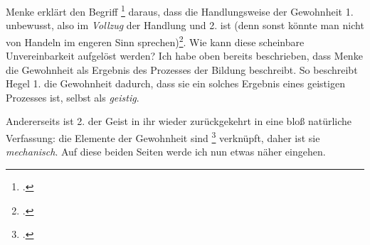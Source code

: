 \documentclass[12pt, a4paper, openany]{report}
\begin{document}
Menke erklärt den Begriff \footcite[][145]{menke_autonomie_2018} daraus, dass die Handlungsweise der Gewohnheit 1. unbewusst, also im \emph{Vollzug} der Handlung  und 2.  ist (denn sonst könnte man nicht von Handeln im engeren Sinn sprechen)\footcite[][128]{menke_autonomie_2018}.
Wie kann diese scheinbare Unvereinbarkeit aufgelöst werden?
Ich habe oben bereits beschrieben, dass Menke die Gewohnheit als Ergebnis des Prozesses der Bildung beschreibt.
So beschreibt Hegel 1. die Gewohnheit dadurch, dass sie ein solches Ergebnis eines geistigen Prozesses ist, selbst als \emph{geistig}. 
\begin{comment}
Dem füge ich noch hinzu, dass sie nicht nur auf Grund des geistigen Prozesses, der Einwohnung, sondern eben dadurch geistig ist, dass der Prozess selbst aus Gründen angeeignet wurde, so beschreibt Menke, die Teilnahme an der sozialen Praxis, als eine Teilnahme \emph{aus Gründen}.
Menke beschreibt den Prozess der Bildung, als die \qq{>>Einwohnung<< eines künstlichen Zwecks}\footcite[][129]{menke_autonomie_2018}.
\end{comment}
Andererseits ist 2. der Geist in ihr wieder zurückgekehrt in eine bloß natürliche Verfassung: 
die Elemente der Gewohnheit sind \footcite[][129]{menke_autonomie_2018} verknüpft, daher ist sie \emph{mechanisch}.
Auf diese beiden Seiten werde ich nun etwas näher eingehen.\\
\end{document}
